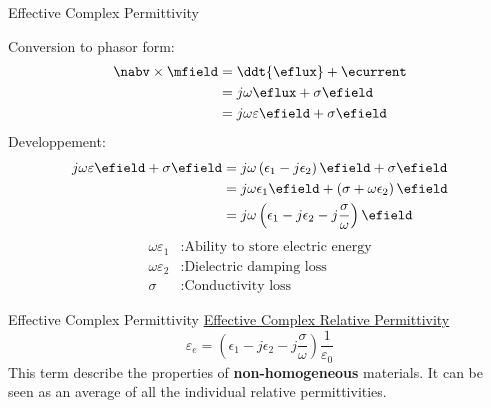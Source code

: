 \begin{frame}{Effective Complex Permittivity}
    \begin{twocolumns}[0.5]
     \leftcol
         Conversion to phasor form:
        \begin{equation*}
            \begin{aligned}
                \nabv \times \mfield &= \ddt{\eflux} + \ecurrent \\
                &= j\omega \eflux + \sigma \efield\\
                &= j\omega \varepsilon \efield + \sigma \efield\\
            \end{aligned}
        \end{equation*}
            Developpement:
        \begin{equation*}
            \begin{aligned}
                j\omega \varepsilon \efield + \sigma \efield &= j\omega \left(\epsilon_1 - j \epsilon_2\right)\efield + \sigma \efield \\
                &= j\omega \epsilon_1 \efield +  \left( \sigma + \omega \epsilon_2 \right)\efield \\
                &= j\omega \left(\epsilon_1 - j \epsilon_2 - j \frac{\sigma}{\omega}\right)\efield\\
            \end{aligned}
        \end{equation*}
    \rightcol
        \begin{equation*}
            \begin{aligned}
                \omega \varepsilon_1 &: \text{Ability to store electric energy}\\
                \omega \varepsilon_2 &: \text{Dielectric damping loss}\\
                \sigma &: \text{Conductivity loss}
            \end{aligned}
        \end{equation*}
    \end{twocolumns}
\end{frame}

\begin{frame}{Effective Complex Permittivity}
    \centering
    \underline{Effective Complex Relative Permittivity}
    \begin{equation}
        \varepsilon_e = \left(\epsilon_1 - j\epsilon_2 - j\frac{\sigma}{\omega}\right)\frac{1}{\varepsilon_0}
    \end{equation}
    This term describe the properties of \textbf{non-homogeneous} materials. It can be seen as an average of all the individual relative permittivities.

\end{frame}


